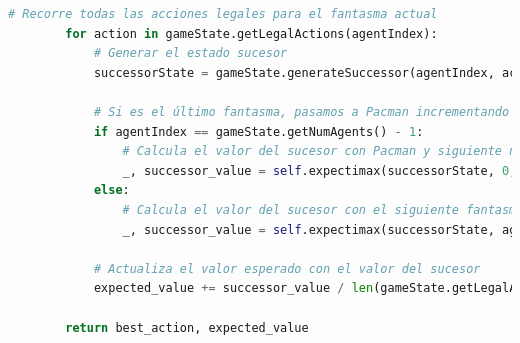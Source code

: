 \documentclass{report}
\begin{document}
\begin{lstlisting}[language=Python, caption=Implementación inicial del agente Expectimax]
        # Recorre todas las acciones legales para el fantasma actual
        for action in gameState.getLegalActions(agentIndex):
            # Generar el estado sucesor
            successorState = gameState.generateSuccessor(agentIndex, action)
            
            # Si es el último fantasma, pasamos a Pacman incrementando la profundidad
            if agentIndex == gameState.getNumAgents() - 1:
                # Calcula el valor del sucesor con Pacman y siguiente nivel de profundidad
                _, successor_value = self.expectimax(successorState, 0, depth + 1)
            else:
                # Calcula el valor del sucesor con el siguiente fantasma
                _, successor_value = self.expectimax(successorState, agentIndex + 1, depth)
            
            # Actualiza el valor esperado con el valor del sucesor
            expected_value += successor_value / len(gameState.getLegalActions(agentIndex))

        return best_action, expected_value
          \end{lstlisting}
\end{document}
